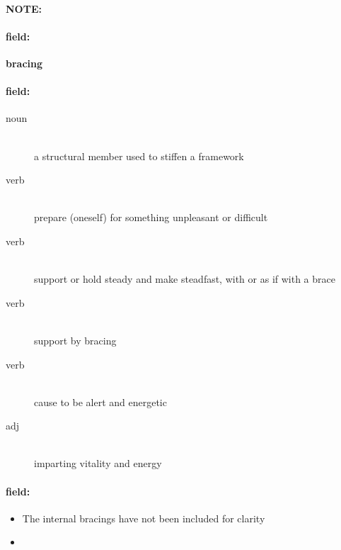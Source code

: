 \documentclass[12pt]{article}
\newenvironment{note}{\paragraph{NOTE:}}{}
\newenvironment{field}{\paragraph{field:}}{}
\begin{document}
\begin{note}
\begin{field}
\textbf{\large bracing}
\end{field}


\begin{field}
\begin{description}
\item[noun] \hfill \\ 
a structural member used to stiffen a framework

\item[verb] \hfill \\ 
prepare (oneself) for something unpleasant or difficult

\item[verb] \hfill \\ 
support or hold steady and make steadfast, with or as if with a brace

\item[verb] \hfill \\ 
support by bracing

\item[verb] \hfill \\ 
cause to be alert and energetic

\item[adj] \hfill \\ 
imparting vitality and energy

\end{description}
\end{field}

\begin{field}
\begin{itemize}
\item The internal bracings have not been included for clarity
\item 
\end{itemize}
\end{field}
\end{note}
\end{document}
